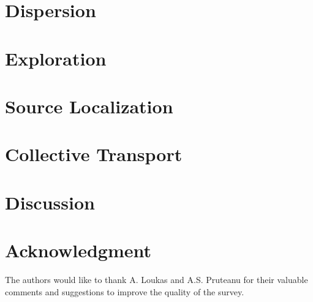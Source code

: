 \documentclass[a4paper]{article}
\begin{document}
\section{Dispersion}
  \label{sec:Dispersion}
  

\section{Exploration}
  \label{sec:Exploration}
  
 
\section{Source Localization}
  \label{sec:Localization}
  

\section{Collective Transport}
  \label{sec:CollectiveTransport}
  
  
%   
 
\section{Discussion}
  \label{sec:Discussion}
  

\section*{Acknowledgment}
The authors would like to thank  A. Loukas and A.S. Pruteanu for their valuable comments and suggestions to improve the quality of the survey.

\clearpage



\end{document}
